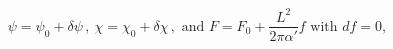 \begin{equation}
\psi=\psi_0+\delta\psi\,,\ \chi=\chi_0+\delta\chi\,,\text{ and }
F=F_0+\frac{L^2}{2\pi\alpha'}f \text{ with } df=0,
\end{equation}


